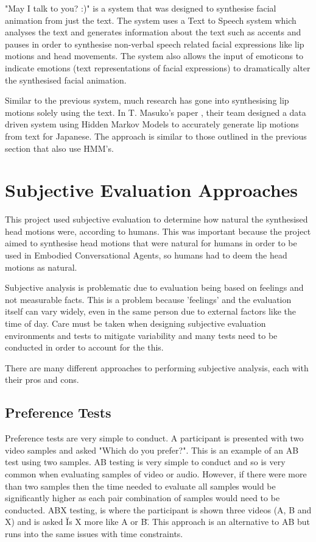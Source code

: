 \documentclass[bsc,frontabs,twoside,singlespacing,parskip]{infthesis}
\begin{document}
"May I talk to you? :)"  \cite{may_i_talk_to_you} is a system that was designed to synthesise facial animation from just the text. The system uses a Text to Speech system which analyses the text and generates information about the text such as accents and pauses in order to synthesise non-verbal speech related facial expressions like lip motions and head movements. The system also allows the input of emoticons to indicate emotions (text representations of facial expressions) to dramatically alter the synthesised facial animation. 

Similar to the previous system, much research has gone into synthesising lip motions solely using the text. In T. Masuko's paper  \cite{lip_motion}, their team designed a data driven system using Hidden Markov Models to accurately generate lip motions from text for Japanese. The approach is similar to those outlined in the previous section that also use HMM's.

\section{Subjective Evaluation Approaches}

This project used subjective evaluation to determine how natural the synthesised head motions were, according to humans. This was important because the project aimed to synthesise head motions that were natural for humans in order to be used in Embodied Conversational Agents, so humans had to deem the head motions as natural.

Subjective analysis is problematic due to evaluation being based on feelings and not measurable facts. This is a problem because 'feelings' and the evaluation itself can vary widely, even in the same person due to external factors like the time of day. Care must be taken when designing subjective evaluation environments and tests to mitigate variability and many tests need to be conducted in order to account for the this. 

There are many different approaches to performing subjective analysis, each with their pros and cons. 

\subsection{Preference Tests}

Preference tests are very simple to conduct. A participant is presented with two video samples and asked "Which do you prefer?". This is an example of an AB test using two samples. AB testing is very simple to conduct and so is very common when evaluating samples of video or audio. However, if there were more than two samples then the time needed to evaluate all samples would be significantly higher as each pair combination of samples would need to be conducted. ABX testing, \cite{abx_testing} is where the participant is shown three videos (A, B and X) and is asked \"Is X more like A or B\". This approach is an alternative to AB but runs into the same issues with time constraints.
\end{document}
